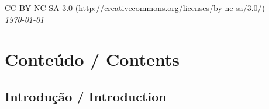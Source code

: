 \documentclass[11pt,a4paper]{book} %
\begin{document}
CC BY-NC-SA 3.0 (http://creativecommons.org/licenses/by-nc-sa/3.0/)\\ %

\noindent \textit{\today} %


%
%
%
%

\part{Conteúdo / Contents}

\chapter{Introdução / Introduction}


\end{document}

